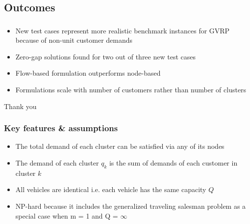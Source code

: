 \documentclass[11pt]{beamer}
\begin{document}
\subsection{Outcomes}
\begin{frame}
\frametitle{\subsecname}
\begin{itemize}
\item New test cases represent more realistic benchmark instances for GVRP because of non-unit customer demands
\item Zero-gap solutions found for two out of three new test cases
\item Flow-based formulation outperforms node-based 
\item Formulations scale with number of customers rather than number of clusters
\end{itemize}
\end{frame}

\begin{frame}[noframenumbering]
\Huge Thank you
\end{frame}

\begin{frame}[noframenumbering]
\frametitle{Key features \& assumptions}
\begin{itemize}
\item The total demand of each cluster can be satisfied via any of its nodes
\item The demand of each cluster $q_k$ is the sum of demands of each customer in cluster $k$
\item All vehicles are identical i.e. each vehicle has the same capacity $Q$
\item NP-hard because it includes the generalized traveling salesman problem as a special case when m = 1 and Q = $\infty$
\end{itemize}
\end{frame}
\end{document}

